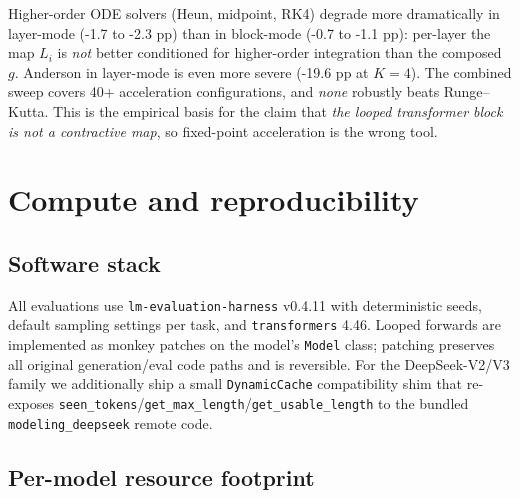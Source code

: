 Higher-order ODE solvers (Heun, midpoint, RK4) degrade more dramatically in layer-mode (-1.7 to -2.3 pp) than in block-mode (-0.7 to -1.1 pp): per-layer the map $L_i$ is \emph{not} better conditioned for higher-order integration than the composed $g$. Anderson in layer-mode is even more severe (-19.6 pp at $K{=}4$). The combined sweep covers 40+ acceleration configurations, and \emph{none} robustly beats Runge--Kutta. This is the empirical basis for the claim that \emph{the looped transformer block is not a contractive map}, so fixed-point acceleration is the wrong tool.

\section{Compute and reproducibility}
\label{app:reproducibility}

\subsection{Software stack}

All evaluations use \texttt{lm-evaluation-harness} v0.4.11 with deterministic seeds, default sampling settings per task, and \texttt{transformers} 4.46. Looped forwards are implemented as monkey patches on the model's \texttt{Model} class; patching preserves all original generation/eval code paths and is reversible. For the DeepSeek-V2/V3 family we additionally ship a small \texttt{DynamicCache} compatibility shim that re-exposes \texttt{seen\_tokens}/\texttt{get\_max\_length}/\texttt{get\_usable\_length} to the bundled \texttt{modeling\_deepseek} remote code.

\subsection{Per-model resource footprint}

